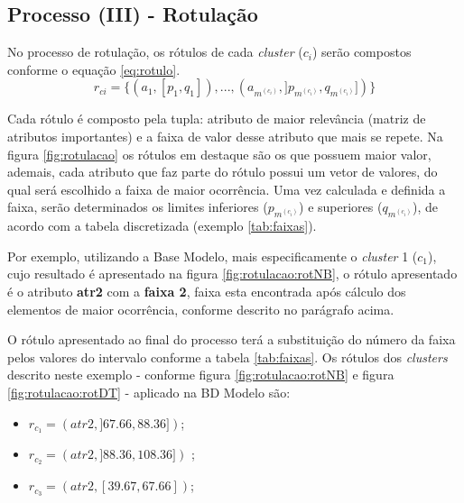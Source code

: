\subsection{Processo (III) - Rotulação} \label{cap:ferramentas:ssec:rotulacao}

No processo de rotulação, os rótulos de cada \textit{cluster} (${c_i}$) serão compostos conforme o  equação \ref{eq:rotulo}. 
\begin{equation}\label{eq:rotulo}
r_{ci}=\{ (a_1,[p_1,q_1]),...,(a_{m^{(c_i)}}, ]p_{m^{(c_i)}},q_{m^{(c_i)}}]) \} 
\end{equation}

 Cada rótulo é composto pela tupla: atributo de maior relevância (matriz de atributos importantes) e a faixa de valor desse atributo que mais se repete. Na figura \ref{fig:rotulacao} os rótulos em destaque são os que possuem maior valor, ademais, cada atributo que faz parte do rótulo possui um vetor de valores, do qual será escolhido a faixa de maior ocorrência. Uma vez calculada e definida a faixa, serão determinados os limites inferiores (${p_{m^{(c_i)}}}$) e superiores (${q_{m^{(c_i)}}}$), de acordo com a tabela discretizada (exemplo \ref{tab:faixas}).

Por exemplo, utilizando a Base Modelo, mais especificamente o \textit{cluster} 1 ($c_1$), cujo resultado é apresentado na figura \ref{fig:rotulacao:rotNB}, o rótulo apresentado é o atributo \textbf{atr2} com a \textbf{faixa 2}, faixa esta encontrada após cálculo dos elementos de maior ocorrência, conforme descrito no parágrafo acima. 

O rótulo apresentado ao final do processo terá a substituição do número da faixa pelos valores do intervalo conforme a tabela \ref{tab:faixas}. Os rótulos dos \textit{clusters} descrito neste exemplo - conforme figura \ref{fig:rotulacao:rotNB} e figura \ref{fig:rotulacao:rotDT} - aplicado na BD Modelo são: 

\begin{itemize}[noitemsep]
            \item ${r_{c_1}=(atr2,]67.66, 88.36])}$;
            \item ${r_{c_2}=(atr2,]88.36, 108.36])}$ ;
            \item ${r_{c_3}=(atr2,[39.67, 67.66])}$;
            
\end{itemize}



